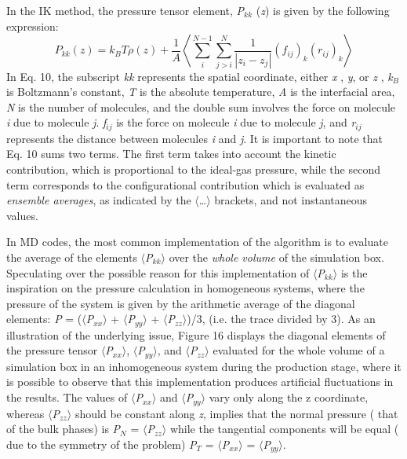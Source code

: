 \documentclass[9pt,bestpractices]{livecoms}
\begin{document}
In the IK method, the pressure tensor element, \textit{P}$_{kk}$ (\textit{z}) is given by the following expression:
\begin{equation}
P_{kk}\left(z\right)=k_{B}T\rho\left(z\right)+\frac{1}{A}\left\langle \sum_{{\scriptstyle i}}^{{\scriptstyle N-1}}\sum_{{\scriptstyle j>i}}^{N}\frac{1}{\left|z_{i}-z_{j}\right|}\left(f_{ij}\right)_{k}\left(r_{ij}\right)_{k}\right\rangle 
\end{equation}
In Eq. 10, the subscript \textit{kk} represents the spatial coordinate, either
\textit{x} , \textit{y}, or \textit{z} , \textit{k}$_{B}$ is Boltzmann's
constant, \textit{T} is the absolute temperature, \textit{A} is the interfacial
area, \textit{N} is the number of molecules, and the double sum involves the
force on molecule \textit{i} due to molecule \textit{j}. \textit{f}$_{ij}$ is
the force on molecule \textit{i} due to molecule \textit{j}, and
\textit{r}$_{ij}$ represents the distance between molecules \textit{i} and
\textit{j}. It is important to note that Eq. 10 sums two terms.
The first term takes into account the kinetic contribution, which is
proportional to the ideal-gas pressure, while the second term corresponds to
the configurational contribution which is evaluated as \textit{ensemble averages}, as
indicated by the ${\langle}${\ldots}${\rangle}$ brackets, and not instantaneous
values.

In MD codes, the most common implementation of the algorithm is to evaluate the
average of the elements ${\langle}$\textit{P}$_{kk}$${\rangle}$ over the \textit{whole
volume} of the simulation box. Speculating over the possible reason for this
implementation of ${\langle}$\textit{P}$_{kk}$${\rangle}$ is the inspiration on
the pressure calculation in homogeneous systems, where the pressure of the
system is given by the arithmetic average of the diagonal elements: \textit{P}
= (${\langle}$\textit{P}$_{xx}$${\rangle}$
+ ${\langle}$\textit{P}$_{yy}$${\rangle}$
+ ${\langle}$\textit{P}$_{zz}$${\rangle}$)/3, (i.e. the trace divided by 3). As an illustration of the
underlying issue, Figure 16 displays the diagonal elements of the pressure
tensor ${\langle}$\textit{P}$_{xx}$${\rangle}$,
${\langle}$\textit{P}$_{yy}$${\rangle}$, and
${\langle}$\textit{P}$_{zz}$${\rangle}$ evaluated for the whole volume of
a simulation box in an inhomogeneous system during the production stage, where
it is possible to observe that this implementation produces artificial
fluctuations in the results.  The values of
${\langle}$\textit{P}$_{xx}$${\rangle}$ and
${\langle}$\textit{P}$_{yy}$${\rangle}$ vary only along the z coordinate,
whereas ${\langle}$\textit{P}$_{zz}$${\rangle}$ should be constant along
\textit{z},  implies that the normal pressure ( that of the bulk phases) is
\textit{P}$_{N}$ = ${\langle}$\textit{P}$_{zz}$${\rangle}$ while the tangential
components will be equal ( due to the symmetry of the problem)
\textit{P}$_{T}$ = ${\langle}$\textit{P}$_{xx}$${\rangle}$
= ${\langle}$\textit{P}$_{yy}$${\rangle}$. 
\end{document}
